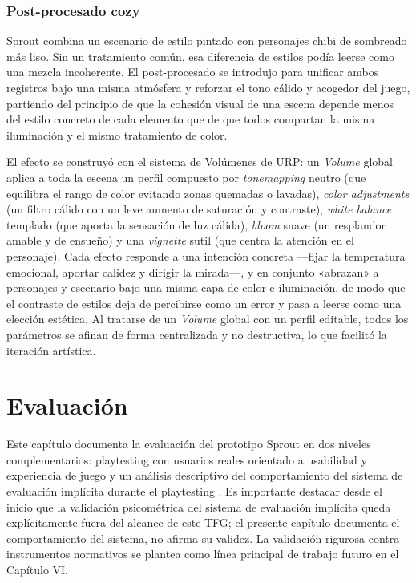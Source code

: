 \documentclass[12pt,twoside,titlepage]{report}
\begin{document}
\subsection{Post-procesado cozy}

Sprout combina un escenario de estilo pintado con personajes chibi de sombreado más liso. Sin un tratamiento común, esa diferencia de estilos podía leerse como una mezcla incoherente. El post-procesado se introdujo para unificar ambos registros bajo una misma atmósfera y reforzar el tono cálido y acogedor del juego, partiendo del principio de que la cohesión visual de una escena depende menos del estilo concreto de cada elemento que de que todos compartan la misma iluminación y el mismo tratamiento de color.

El efecto se construyó con el sistema de Volúmenes de URP: un \textit{Volume} global aplica a toda la escena un perfil compuesto por \textit{tonemapping} neutro (que equilibra el rango de color evitando zonas quemadas o lavadas), \textit{color adjustments} (un filtro cálido con un leve aumento de saturación y contraste), \textit{white balance} templado (que aporta la sensación de luz cálida), \textit{bloom} suave (un resplandor amable y de ensueño) y una \textit{vignette} sutil (que centra la atención en el personaje). Cada efecto responde a una intención concreta ---fijar la temperatura emocional, aportar calidez y dirigir la mirada---, y en conjunto «abrazan» a personajes y escenario bajo una misma capa de color e iluminación, de modo que el contraste de estilos deja de percibirse como un error y pasa a leerse como una elección estética. Al tratarse de un \textit{Volume} global con un perfil editable, todos los parámetros se afinan de forma centralizada y no destructiva, lo que facilitó la iteración artística.

\chapter{Evaluación}

Este capítulo documenta la evaluación del prototipo Sprout en dos niveles complementarios: playtesting con usuarios reales orientado a usabilidad y experiencia de juego  y un análisis descriptivo del comportamiento del sistema de evaluación implícita durante el playtesting . Es importante destacar desde el inicio que la validación psicométrica del sistema de evaluación implícita queda explícitamente fuera del alcance de este TFG; el presente capítulo documenta el comportamiento del sistema, no afirma su validez. La validación rigurosa contra instrumentos normativos se plantea como línea principal de trabajo futuro en el Capítulo VI.
\end{document}
